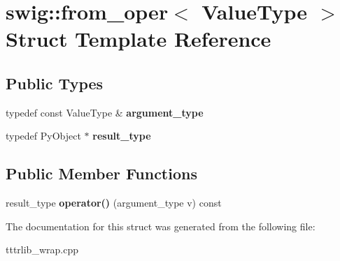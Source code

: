 \hypertarget{structswig_1_1from__oper}{}\section{swig\+:\+:from\+\_\+oper$<$ Value\+Type $>$ Struct Template Reference}
\label{structswig_1_1from__oper}
\subsection*{Public Types}
\begin{DoxyCompactItemize}
\item 
\mbox{\label{structswig_1_1from__oper_a33151174816bb2d002b7b504bcfc1902}} 
typedef const Value\+Type \& {\bfseries argument\+\_\+type}
\item 
\mbox{\label{structswig_1_1from__oper_aceed5a894a65b69078106cda841f6021}} 
typedef Py\+Object $\ast$ {\bfseries result\+\_\+type}
\end{DoxyCompactItemize}
\subsection*{Public Member Functions}
\begin{DoxyCompactItemize}
\item 
\mbox{\label{structswig_1_1from__oper_a8c92f4feba24d5a1ee72e2fc25b38ce3}} 
result\+\_\+type {\bfseries operator()} (argument\+\_\+type v) const
\end{DoxyCompactItemize}


The documentation for this struct was generated from the following file\+:\begin{DoxyCompactItemize}
\item 
tttrlib\+\_\+wrap.\+cpp\end{DoxyCompactItemize}

